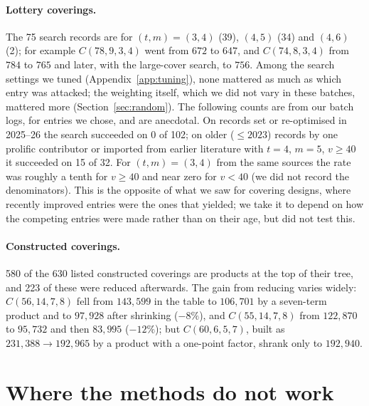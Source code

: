 \documentclass[11pt]{article}
\theoremstyle{remark}
\begin{document}
\paragraph{Lottery coverings.} The 75 search records are for $(t,m)=(3,4)$ (39), $(4,5)$ (34) and $(4,6)$ (2); for
example $C(78,9,3,4)$ went from $672$ to $647$, and $C(74,8,3,4)$ from $784$ to $765$ and later, with the large-cover
search, to $756$. Among the search settings we tuned (Appendix~\ref{app:tuning}), none mattered as much as which entry was
attacked; the weighting itself, which we did not vary in these batches, mattered more (Section~\ref{sec:random}). The
following counts are from our batch logs, for entries we chose, and are anecdotal. On records set or re-optimised in 2025--26
the search succeeded on 0 of 102; on older ($\le 2023$) records by one prolific contributor or imported from earlier
literature with $t=4$, $m=5$, $v\ge 40$ it succeeded on 15 of 32. For $(t,m)=(3,4)$ from the same sources the rate was
roughly a tenth for $v\ge 40$ and near zero for $v<40$ (we did not record the denominators). This is the opposite of
what we saw for covering designs, where recently improved entries were the ones that yielded; we take it to depend on
how the competing entries were made rather than on their age, but did not test this.

\paragraph{Constructed coverings.} 580 of the 630 listed constructed coverings are products at the top of their tree,
and 223 of these were reduced afterwards. The gain from reducing varies widely: $C(56,14,7,8)$ fell from $143{,}599$
in the table to $106{,}701$ by a seven-term product and to $97{,}928$ after shrinking ($-8\%$), and $C(55,14,7,8)$ from
$122{,}870$ to $95{,}732$ and then $83{,}995$ ($-12\%$); but $C(60,6,5,7)$, built as $231{,}388\to 192{,}965$ by a
product with a one-point factor, shrank only to $192{,}940$.

\section{Where the methods do not work}\label{sec:fail}
\end{document}

